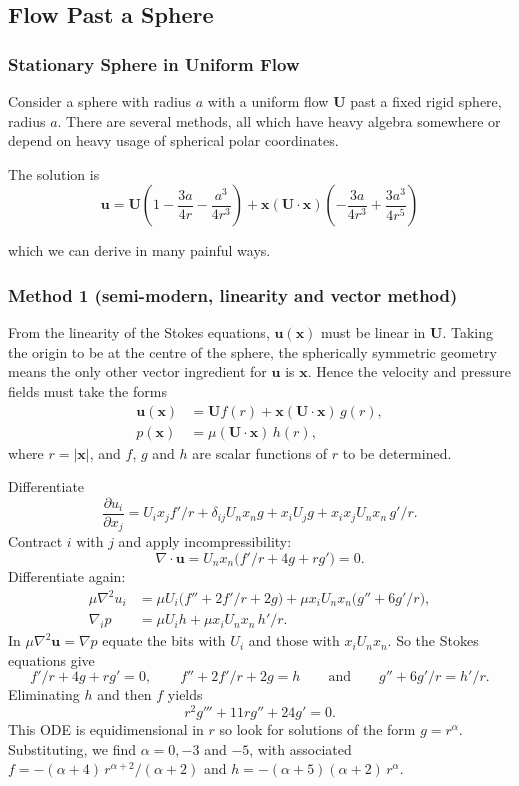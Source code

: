 \documentclass{article}
\begin{document}
\subsection{Flow Past a Sphere}
\subsubsection{Stationary Sphere in Uniform Flow}
Consider a sphere with radius $ a $ with a uniform flow $ \mathbf U $ past a fixed rigid sphere, radius $ a $. There are several methods, all which have heavy algebra somewhere or depend on heavy usage of spherical polar coordinates.
\par
The solution is
\[
	\mathbf u =\mathbf U \left(1 - \frac{3a}{4r} - \frac{a^3}{4r^3}\right) + \mathbf x(\mathbf U\cdot\mathbf x) \left(-\frac {3a}{4r^3} + \frac {3a^3}{4r^5}\right)
\]

which we can derive in many painful ways.
\subsubsection{Method 1 (semi-modern, linearity and vector method)}

From the linearity of the Stokes equations, $\mathbf{u}(\mathbf{x})$ must be linear in $\mathbf{U}$. Taking the origin to be at the centre of the sphere, the spherically symmetric geometry means the only other vector ingredient for $\mathbf{u}$ is $\mathbf{x}$. Hence the velocity and pressure fields must take the forms
\begin{align*}
  \mathbf{u}(\mathbf{x}) &= \mathbf{U} f(r) + \mathbf{x}(\mathbf{U}\cdot\mathbf{x})\, g(r), \\
  p(\mathbf{x}) &= \mu (\mathbf{U}\cdot\mathbf{x})\, h(r),
\end{align*}
where $r = |\mathbf{x}|$, and $f$, $g$ and $h$ are scalar functions of $r$ to be determined.

Differentiate
\begin{equation}
  \frac{\partial u_i}{\partial x_j}
  = U_i x_j f'/r + \delta_{ij} U_n x_n g + x_i U_j g + x_i x_j U_n x_n\, g'/r.
  \tag{$*$}
\end{equation}
Contract $i$ with $j$ and apply incompressibility:
\[
  \nabla\cdot\mathbf{u} = U_n x_n \bigl( f'/r + 4g + r g' \bigr) = 0.
\]
Differentiate again:
\begin{align*}
  \mu\nabla^2 u_i &= \mu U_i \bigl( f'' + 2f'/r + 2g \bigr) + \mu x_i U_n x_n \bigl( g'' + 6g'/r \bigr), \\
  \nabla_i p &= \mu U_i h + \mu x_i U_n x_n\, h'/r.
\end{align*}
In $\mu\nabla^2\mathbf{u} = \nabla p$ equate the bits with $U_i$ and those with $x_i U_n x_n$. So the Stokes equations give
\[
  f'/r + 4g + r g' = 0, \qquad f'' + 2f'/r + 2g = h \qquad\text{and}\qquad g'' + 6g'/r = h'/r.
\]
Eliminating $h$ and then $f$ yields
\[
  r^2 g''' + 11 r g'' + 24 g' = 0.
\]
This ODE is equidimensional in $r$ so look for solutions of the form $g = r^\alpha$. Substituting, we find $\alpha = 0, -3$ and $-5$, with associated $f = -(\alpha+4)\, r^{\alpha+2}/(\alpha+2)$ and $h = -(\alpha+5)(\alpha+2)\, r^\alpha$.
\end{document}
